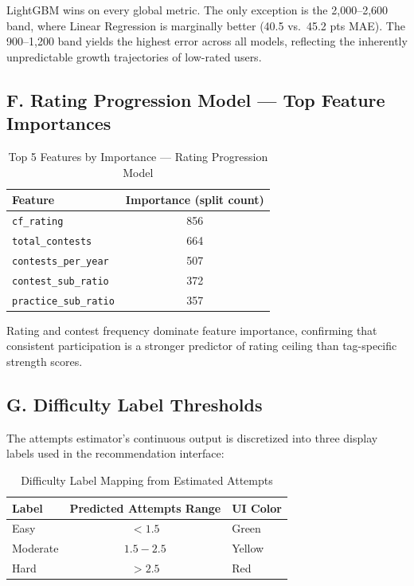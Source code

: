 \documentclass[12pt,a4paper]{article}
\begin{document}
LightGBM wins on every global metric. The only exception is the 2{,}000–2{,}600
band, where Linear Regression is marginally better (40.5 vs.\ 45.2 pts MAE).
The 900–1{,}200 band yields the highest error across all models, reflecting
the inherently unpredictable growth trajectories of low-rated users.
 
\subsection*{F. Rating Progression Model — Top Feature Importances}
 
\begin{table}[H]
\centering
\caption{Top 5 Features by Importance — Rating Progression Model}
\begin{tabular}{|l|c|}
\hline
\textbf{Feature} & \textbf{Importance (split count)} \\
\hline
\texttt{cf\_rating}           & 856 \\
\texttt{total\_contests}      & 664 \\
\texttt{contests\_per\_year}  & 507 \\
\texttt{contest\_sub\_ratio}  & 372 \\
\texttt{practice\_sub\_ratio} & 357 \\
\hline
\end{tabular}
\end{table}
 
Rating and contest frequency dominate feature importance, confirming that
consistent participation is a stronger predictor of rating ceiling than
tag-specific strength scores.
 
\subsection*{G. Difficulty Label Thresholds}
 
The attempts estimator's continuous output is discretized into three
display labels used in the recommendation interface:
 
\begin{table}[H]
\centering
\caption{Difficulty Label Mapping from Estimated Attempts}
\begin{tabular}{|l|c|l|}
\hline
\textbf{Label} & \textbf{Predicted Attempts Range} & \textbf{UI Color} \\
\hline
Easy     & $< 1.5$       & Green  \\
Moderate & $1.5 - 2.5$   & Yellow \\
Hard     & $> 2.5$       & Red    \\
\hline
\end{tabular}
\end{table}
 
\end{document}
